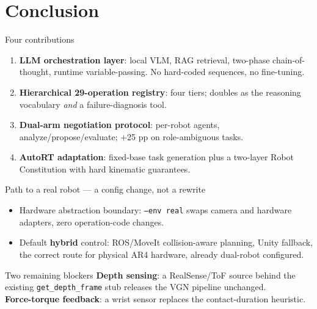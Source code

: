 \documentclass[aspectratio=169,11pt]{beamer}
\begin{document}
\section{Conclusion}

\begin{frame}{Four contributions}
	\begin{enumerate}
		\item \textbf{LLM orchestration layer}: local VLM, RAG retrieval, two-phase
		      chain-of-thought, runtime variable-passing. No hard-coded sequences, no fine-tuning.
		\item \textbf{Hierarchical 29-operation registry}: four tiers; doubles as the
		      reasoning vocabulary \emph{and} a failure-diagnosis tool.
		\item \textbf{Dual-arm negotiation protocol}: per-robot agents, analyze/propose/evaluate;
		      +25 pp on role-ambiguous tasks.
		\item \textbf{AutoRT adaptation}: fixed-base task generation plus a two-layer Robot
		      Constitution with hard kinematic guarantees.
	\end{enumerate}
\end{frame}

\begin{frame}{Path to a real robot --- a config change, not a rewrite}
	\begin{itemize}
		\item Hardware abstraction boundary: \texttt{--env real} swaps camera and hardware adapters,
		      \alert{zero operation-code changes}.
		\item Default \textbf{hybrid} control: ROS/MoveIt collision-aware planning, Unity fallback,
		      the correct route for physical AR4 hardware, already dual-robot configured.
	\end{itemize}
	\vfill
	\begin{block}{Two remaining blockers}
		\footnotesize
		\textbf{Depth sensing}: a RealSense/ToF source behind the existing
		\texttt{get\_depth\_frame} stub releases the VGN pipeline unchanged.\\
		\textbf{Force-torque feedback}: a wrist sensor replaces the contact-duration heuristic.
	\end{block}
\end{frame}
\end{document}

